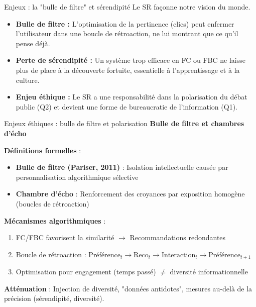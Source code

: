 \documentclass[9pt, aspectratio=169]{beamer}
\begin{document}
\begin{frame}{Enjeux : la "bulle de filtre" et sérendipité}
    Le SR façonne notre vision du monde.
    \begin{itemize}
        \item \textbf{Bulle de filtre :} L'optimisation de la pertinence (clics) peut enfermer l'utilisateur dans une boucle de rétroaction, ne lui montrant que ce qu'il pense déjà.
        \item \textbf{Perte de sérendipité :} Un système trop efficace en FC ou FBC ne laisse plus de place à la découverte fortuite, essentielle à l'apprentissage et à la culture.
        \item \textbf{Enjeu éthique :} Le SR a une responsabilité dans la polarisation du débat public (Q2) et devient une forme de bureaucratie de l'information (Q1).
    \end{itemize}
\end{frame}

\begin{frame}{Enjeux éthiques : bulle de filtre et polarisation}
    \textbf{Bulle de filtre et chambres d'écho}
    
    \vspace{0.3cm}
    \textbf{Définitions formelles} :
    \begin{itemize}
        \item \textbf{Bulle de filtre (Pariser, 2011)} : Isolation intellectuelle causée par personnalisation algorithmique sélective
        \item \textbf{Chambre d'écho} : Renforcement des croyances par exposition homogène (boucles de rétroaction)
    \end{itemize}
    
    \vspace{0.3cm}
    \textbf{Mécanismes algorithmiques} :
    \begin{enumerate}
        \item FC/FBC favorisent la similarité $\rightarrow$ Recommandations redondantes
        \item Boucle de rétroaction : \(\text{Préférence}_t \rightarrow \text{Reco}_t \rightarrow \text{Interaction}_t \rightarrow \text{Préférence}_{t+1}\)
        \item Optimisation pour engagement (temps passé) \(\neq\) diversité informationnelle
    \end{enumerate}
    
    \vspace{0.3cm}
    \textbf{Atténuation} : Injection de diversité, "données antidotes", mesures au-delà de la précision (sérendipité, diversité).
\end{frame}
\end{document}
